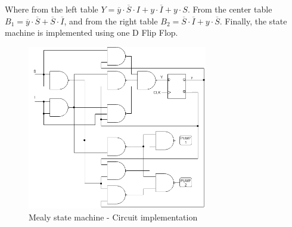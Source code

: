 \begin{center}
     \begin{Karnaughvuit}
     \end{Karnaughvuit}
     \begin{Karnaughvuit}
     \end{Karnaughvuit}
     \begin{Karnaughvuit}
     \end{Karnaughvuit}
\end{center}
Where from the left table $Y = \overline{y} \cdot \overline{S} \cdot I + y \cdot \overline{I} + y \cdot S$. 
From the center table $B_1 = \overline{y} \cdot \overline{S} + \overline{S} \cdot \overline{I}$, and from the 
right table $B_2 = \overline{S} \cdot \overline{I} + y \cdot \overline{S}$.
Finally, the state machine is implemented using
one D Flip Flop.

\begin{figure}[H]
    \begin{centering}
    \includegraphics[width=0.7\textwidth]{Graficos1/1b_Compuertas_Mealy.png}
    \par\end{centering}
    \caption{Mealy state machine - Circuit implementation}
\end{figure}

